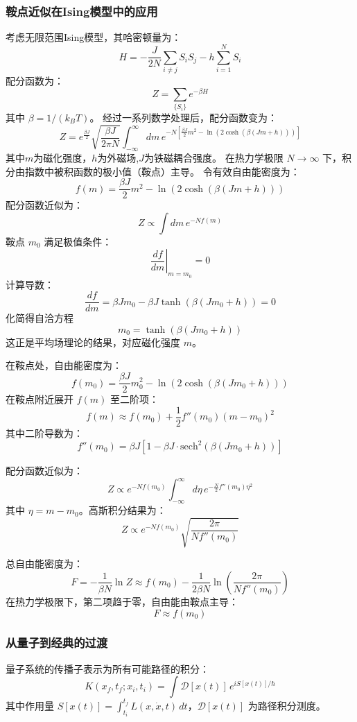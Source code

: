 \documentclass[12pt, a4paper, oneside]{ctexart}
\begin{document}
\subsubsection{鞍点近似在Ising模型中的应用}
考虑无限范围Ising模型，其哈密顿量为：
\[
H = -\frac{J}{2N} \sum_{i \neq j} S_i S_j - h \sum_{i=1}^N S_i
\]
配分函数为：
\[
Z = \sum_{\{S_i\}} e^{-\beta H}
\]
其中 \( \beta = 1/(k_B T) \)。
经过一系列数学处理后，配分函数变为：
\[
Z = e^{\frac{\beta J}{2}} \sqrt{\frac{\beta J}{2\pi N}} \int_{-\infty}^\infty dm \, e^{-N \left[ \frac{\beta J}{2} m^2 - \ln \left( 2 \cosh(\beta (J m + h)) \right) \right]}
\]
其中\(m\)为磁化强度，\(h\)为外磁场,\(J\)为铁磁耦合强度。
在热力学极限 \( N \to \infty \) 下，积分由指数中被积函数的极小值（鞍点）主导。
令有效自由能密度为：
\[
f(m) = \frac{\beta J}{2} m^2 - \ln \left( 2 \cosh(\beta (J m + h)) \right)
\]
配分函数近似为：
\[
Z \propto \int dm \, e^{-N f(m)}
\]
鞍点 \( m_0 \) 满足极值条件：
\[
\left. \frac{df}{dm} \right|_{m = m_0} = 0
\]
计算导数：
\[
\frac{df}{dm} = \beta J m_0 - \beta J \tanh\left( \beta (J m_0 + h) \right) = 0
\]
化简得自洽方程
\[
m_0 = \tanh\left( \beta (J m_0 + h) \right)
\]
这正是平均场理论的结果，对应磁化强度 \( m \)。

在鞍点处，自由能密度为：
\[
f(m_0) = \frac{\beta J}{2} m_0^2 - \ln \left( 2 \cosh(\beta (J m_0 + h)) \right)
\]
在鞍点附近展开 \( f(m) \) 至二阶项：
\[
f(m) \approx f(m_0) + \frac{1}{2} f''(m_0) (m - m_0)^2
\]
其中二阶导数为：
\[
f''(m_0) = \beta J \left[ 1 - \beta J \cdot \text{sech}^2\left( \beta (J m_0 + h) \right) \right]
\]

配分函数近似为：
\[
Z \propto e^{-N f(m_0)} \int_{-\infty}^\infty d\eta \, e^{-\frac{N}{2} f''(m_0) \eta^2}
\]
其中 \( \eta = m - m_0 \)。高斯积分结果为：
\[
Z \propto e^{-N f(m_0)} \sqrt{\frac{2\pi}{N f''(m_0)}}
\]

总自由能密度为：
\[
F = -\frac{1}{\beta N} \ln Z \approx f(m_0) - \frac{1}{2\beta N} \ln \left( \frac{2\pi}{N f''(m_0)} \right)
\]
在热力学极限下，第二项趋于零，自由能由鞍点主导：
\[
F \approx f(m_0)
\]

\subsubsection{从量子到经典的过渡}

量子系统的传播子表示为所有可能路径的积分：
\[
K(x_f, t_f; x_i, t_i) = \int \mathcal{D}[x(t)] \, e^{i S[x(t)]/\hbar}
\]
其中作用量 \( S[x(t)] = \int_{t_i}^{t_f} L(x, \dot{x}, t) \, dt \)，\(\mathcal{D}[x(t)]\) 为路径积分测度。
\end{document}
